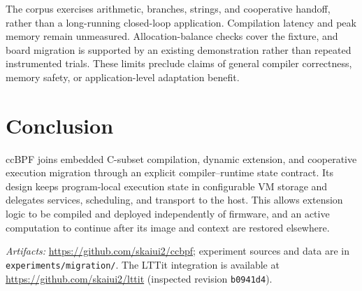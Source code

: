 \documentclass[conference,letterpaper]{IEEEtran}
\newcommand{\code}[1]{\texttt{#1}}
\newif\ifanonymous
\begin{document}
The corpus exercises arithmetic, branches, strings, and cooperative handoff, rather than a long-running closed-loop application. Compilation latency and peak memory remain unmeasured. Allocation-balance checks cover the fixture, and board migration is supported by an existing demonstration rather than repeated instrumented trials. These limits preclude claims of general compiler correctness, memory safety, or application-level adaptation benefit.

\section{Conclusion}
ccBPF joins embedded C-subset compilation, dynamic extension, and cooperative execution migration through an explicit compiler--runtime state contract. Its design keeps program-local execution state in configurable VM storage and delegates services, scheduling, and transport to the host. This allows extension logic to be compiled and deployed independently of firmware, and an active computation to continue after its image and context are restored elsewhere.

\ifanonymous\else
\noindent\textit{Artifacts:} \url{https://github.com/skaiui2/ccbpf}; experiment sources and data are in \code{experiments/migration/}. The LTTit integration is available at \url{https://github.com/skaiui2/lttit} (inspected revision \code{b0941d4}).
\fi
\end{document}
